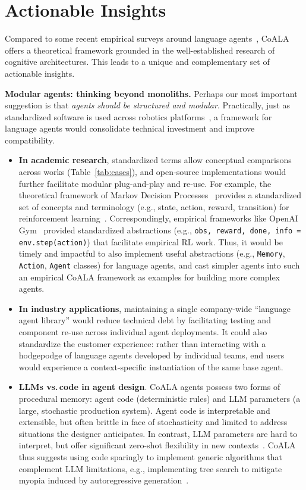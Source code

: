 \documentclass[10pt]{article} %
\begin{document}
\section{Actionable Insights} \label{sec:directions}
Compared to some recent empirical surveys around language agents~\citep{mialon2023augmented, weng2023prompt, wang2023survey},
CoALA offers a theoretical framework grounded in the well-established research of cognitive architectures.
This leads to a unique and complementary set of actionable insights.

\textbf{Modular agents: thinking beyond monoliths.} Perhaps our most important suggestion is that \emph{agents should be structured and modular}. Practically, just as standardized software is used across robotics platforms~\citep{quigley2009ros, macenski2022ros}, a framework for language agents would consolidate technical investment and improve compatibility. 
\begin{itemize}
    \item \textbf{In academic research}, standardized terms allow conceptual comparisons across works (Table~\ref{tab:cases}), and open-source implementations would further facilitate modular plug-and-play and re-use. For example, the theoretical framework of Markov Decision Processes~\citep{puterman2014markov} provides a standardized set of concepts and terminology (e.g., state, action, reward, transition) for reinforcement learning~\citep{sutton2018reinforcement}. Correspondingly, empirical frameworks like OpenAI Gym~\citep{openaigym} provided standardized abstractions (e.g., \texttt{obs, reward, done, info = env.step(action)}) that facilitate empirical RL work. Thus, it would be timely and impactful to also implement useful abstractions (e.g., \texttt{Memory}, \texttt{Action}, \texttt{Agent} classes) for language agents, and cast simpler agents into such an empirical CoALA framework as examples for building more complex agents.
    \item \textbf{In industry applications}, maintaining a single company-wide ``language agent library'' would reduce technical debt \citep{sculley2014highinterest, lwakatare2020large} by facilitating testing and component re-use across individual agent deployments. It could also standardize the customer experience: rather than interacting with a hodgepodge of language agents developed by individual teams, end users would experience a context-specific instantiation of the same base agent.
    \item \textbf{LLMs vs.\,code in agent design}. CoALA agents possess two forms of procedural memory: agent code (deterministic rules) and LLM parameters (a large, stochastic production system). Agent code is interpretable and extensible, but often brittle in face of stochasticity and limited to address situations the designer anticipates. In contrast, LLM parameters are hard to interpret, but offer significant zero-shot flexibility in new contexts~\citep{huang2022language}. CoALA thus suggests using code sparingly to implement generic algorithms that complement LLM limitations, e.g., implementing tree search to mitigate myopia induced by autoregressive generation~\citep{yao2023tree, hao2023reasoning}.
\end{itemize}
\end{document}
